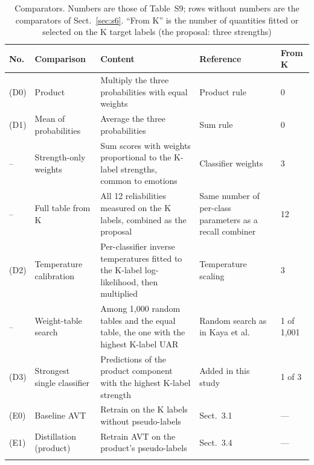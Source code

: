 \documentclass[sn-nature,pdflatex]{sn-jnl}
\begin{document}
\begin{table}[h]
\caption{Comparators. Numbers are those of Table~S9; rows without numbers are the comparators of Sect.~\ref{sec:s6}. ``From K'' is the number of quantities fitted or selected on the K target labels (the proposal: three strengths)}\label{tab:comparators}
\footnotesize\setlength{\tabcolsep}{4pt}
\begin{tabular}{@{}lp{2.8cm}p{4.0cm}p{2.5cm}l@{}}
\toprule
No. & Comparison & Content & Reference & From K \\
\midrule
(D0) & Product & Multiply the three probabilities with equal weights & Product rule \cite{kittler1998} & 0 \\
(D1) & Mean of probabilities & Average the three probabilities & Sum rule \cite{kittler1998} & 0 \\
-- & Strength-only weights & Sum scores with weights proportional to the K-label strengths, common to emotions & Classifier weights \cite{kuncheva2014} & 3 \\
-- & Full table from K & All 12 reliabilities measured on the K labels, combined as the proposal & Same number of per-class parameters as a recall combiner \cite{kuncheva2014} & 12 \\
(D2) & Temperature calibration & Per-classifier inverse temperatures fitted to the K-label log-likelihood, then multiplied & Temperature scaling \cite{guo2017calibration} & 3 \\
-- & Weight-table search & Among 1,000 random tables and the equal table, the one with the highest K-label UAR & Random search as in Kaya et al.\ \cite{kaya2017} & 1 of 1,001 \\
(D3) & Strongest single classifier & Predictions of the product component with the highest K-label strength & Added in this study & 1 of 3 \\
(E0) & Baseline AVT & Retrain on the K labels without pseudo-labels & Sect.~3.1 & --- \\
(E1) & Distillation (product) & Retrain AVT on the product's pseudo-labels & Sect.~3.4 & --- \\
\botrule
\end{tabular}
\end{table}
\end{document}
